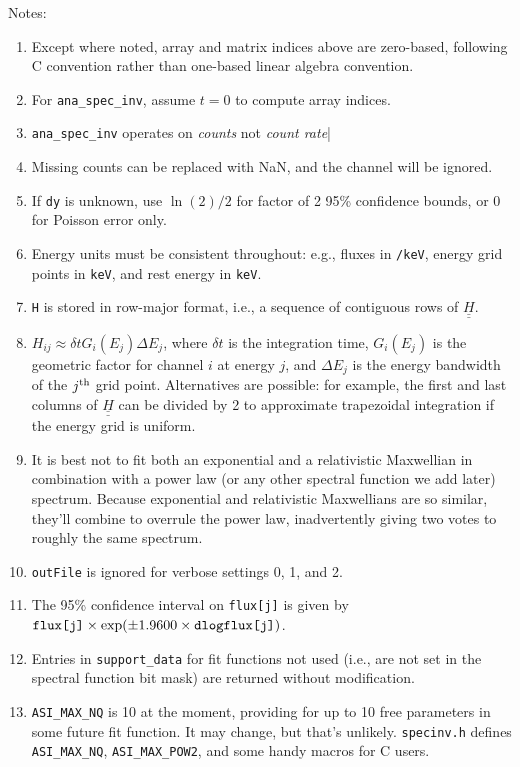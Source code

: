 \documentclass{article}    %
\newcommand{\dbul}[1]{\underline{\underline{#1}}}
\begin{document}
Notes:
\begin{enumerate}
\item Except where noted, array and matrix indices above are zero-based, following C convention rather than one-based linear algebra convention.
\item For \verb|ana_spec_inv|, assume $t=0$ to compute array indices.
\item \verb|ana_spec_inv| operates on {\it counts} not {\it count rate}|
\item Missing counts can be replaced with NaN, and the channel will be ignored.
\item If \verb|dy| is unknown, use $\ln(2)/2$ for factor of 2 95\% confidence bounds, or 0 for Poisson error only.
\item Energy units must be consistent throughout: e.g., fluxes in \verb|/keV|, energy grid points in \verb|keV|, and rest energy in \verb|keV|.
\item \verb|H| is stored in row-major format, i.e., a sequence of contiguous rows of $\dbul{H}$.
\item $H_{ij} \approx \delta t G_i(E_j)\Delta E_j$, where $\delta t$ is the
  integration time, $G_i(E_j)$ is the geometric factor for channel $i$
  at energy $j$, and $\Delta E_j$ is the energy bandwidth of the
  $j^{\rm th}$ grid point. Alternatives are possible:  for example,
  the first and last columns of $\dbul{H}$ can be divided by 2 to
  approximate trapezoidal integration if the energy grid is uniform.
\item It is best not to fit both an exponential and a relativistic
  Maxwellian in combination with a power law (or any other spectral
  function we add later) spectrum. Because exponential and
  relativistic Maxwellians are so similar, they'll combine to overrule
  the power law, inadvertently giving two votes to roughly the same
  spectrum.
\item \verb|outFile| is ignored for verbose settings 0, 1, and 2.
\item The 95\% confidence interval on \verb|flux[j]| is given by $\verb|flux[j]|\times\exp(\pm 1.9600\times\verb|dlogflux[j]|)$.
\item  Entries in \verb|support_data| for fit functions not used (i.e., are not set in the spectral function bit mask) are returned without modification.
\item  \verb|ASI_MAX_NQ| is 10 at the moment, providing for up to 10 free parameters in some future fit function. It may change, but that's unlikely.
	\verb|specinv.h| defines \verb|ASI_MAX_NQ|, \verb|ASI_MAX_POW2|, and some handy macros for C users.
\end{enumerate}
\end{document}
